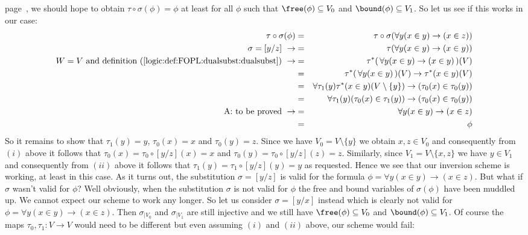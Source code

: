 page~\pageref{logic:def:FOPL:dualsubst:dualsubst}, we should hope to
obtain $\tau\circ\sigma(\phi)=\phi$ at least for all $\phi$ such
that $\free(\phi)\subseteq V_{0}$ and $\bound(\phi)\subseteq V_{1}$.
So let us see if this works in our case:
    \begin{eqnarray*}
    \tau\circ\sigma(\phi)&=&\tau\circ\sigma(\forall y(x\in y)\to(x\in
    z))\\
    \sigma=[y/z]\ \rightarrow&=&\tau(\forall y(x\in y)\to(x\in y))\\
    \mbox{$W=V$ and definition~(\ref{logic:def:FOPL:dualsubst:dualsubst})}\
    \rightarrow
    &=&\tau^{*}(\,\forall y(x\in y)\to(x\in y)\,)(V)\\
    &=&\tau^{*}(\,\forall y(x\in y)\,)(V)\to\tau^{*}(x\in y)(V)\\
    &=&\forall \tau_{1}(y)\tau^{*}(x\in
    y)(V\setminus\{y\})\to(\tau_{0}(x)\in\tau_{0}(y))\\
    &=&\forall\tau_{1}(y)(\tau_{0}(x)\in
    \tau_{1}(y))\to(\tau_{0}(x)\in\tau_{0}(y))\\
    \mbox{A: to be proved}\ \rightarrow&=&\forall y(x\in y)\to(x\in z)\\
    &=&\phi
    \end{eqnarray*}
So it remains to show that $\tau_{1}(y)=y$, $\tau_{0}(x)=x$ and
$\tau_{0}(y)=z$. Since we have $V_{0}=V\setminus\{y\}$ we obtain
$x,z\in V_{0}$ and consequently from $(i)$ above it follows that
$\tau_{0}(x)=\tau_{0}\circ[y/z](x)=x$ and
$\tau_{0}(y)=\tau_{0}\circ[y/z](z)=z$. Similarly, since
$V_{1}=V\setminus\{x,z\}$ we have $y\in V_{1}$ and consequently from
$(ii)$ above it follows that $\tau_{1}(y)=\tau_{1}\circ[y/z](y)=y$
as requested. Hence we see that our inversion scheme is working, at
least in this case. As it turns out, the substitution $\sigma=[y/z]$
is valid for the formula $\phi=\forall y(x\in y)\to(x\in z)$. But
what if $\sigma$ wasn't valid for $\phi$? Well obviously, when the
substitution $\sigma$ is not valid for $\phi$ the free and bound
variables of $\sigma(\phi)$ have been muddled up. We cannot expect
our scheme to work any longer. So let us consider $\sigma=[y/x]$
instead which is clearly not valid for $\phi=\forall y(x\in
y)\to(x\in z)$. Then $\sigma_{|V_{0}}$ and $\sigma_{|V_{1}}$ are
still injective and we still have $\free(\phi)\subseteq V_{0}$ and
$\bound(\phi)\subseteq V_{1}$. Of course the maps
$\tau_{0},\tau_{1}:V\to V$ would need to be different but even
assuming $(i)$ and $(ii)$ above, our scheme would fail:
